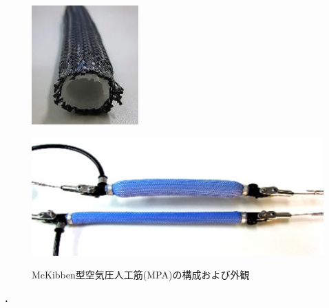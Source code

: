 \begin{figure}[ht]
    \begin{minipage}{0.49\columnwidth}
      \vspace{4mm}
      \centering
      \includegraphics[scale=1]{pic/MPA_kousei.png}
      \vspace{3mm}
      \label{fig:Structure}
    \end{minipage}
    \begin{minipage}{0.49\columnwidth}
      \vspace{25mm}
      \centering
      \includegraphics[scale=0.8]{pic/MPA_dousa.png}
      \label{fig:move}
    \end{minipage}
    \caption{McKibben型空気圧人工筋(MPA)の構成および外観\cite{中西大輔2020}}
    \label{fig:MPA}
  \end{figure}．
\newpage
